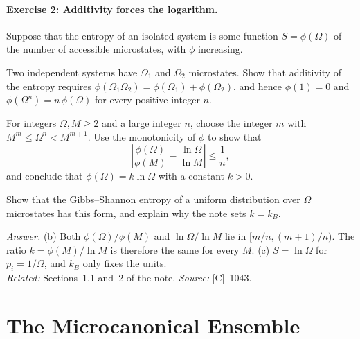 \documentclass[11pt]{article}      %
\numberwithin{equation}{section}   %
\begin{document}
\paragraph{Exercise 2: Additivity forces the logarithm.}
Suppose that the entropy of an isolated system is some function $S = \phi(\Omega)$ of the number of accessible microstates, with $\phi$ increasing.
\begin{parts}
    \item Two independent systems have $\Omega_1$ and $\Omega_2$ microstates. Show that additivity of the entropy requires $\phi(\Omega_1\Omega_2) = \phi(\Omega_1) + \phi(\Omega_2)$, and hence $\phi(1) = 0$ and $\phi(\Omega^n) = n\,\phi(\Omega)$ for every positive integer $n$.
    \item For integers $\Omega, M \ge 2$ and a large integer $n$, choose the integer $m$ with $M^m \le \Omega^n < M^{m+1}$. Use the monotonicity of $\phi$ to show that
    \begin{equation*}
        \left|\frac{\phi(\Omega)}{\phi(M)} - \frac{\ln\Omega}{\ln M}\right| \le \frac{1}{n},
    \end{equation*}
    and conclude that $\phi(\Omega) = k\ln\Omega$ with a constant $k > 0$.
    \item Show that the Gibbs--Shannon entropy of a uniform distribution over $\Omega$ microstates has this form, and explain why the note sets $k = k_B$.
\end{parts}
\textit{Answer.} (b) Both $\phi(\Omega)/\phi(M)$ and $\ln\Omega/\ln M$ lie in $[m/n, (m+1)/n)$. The ratio $k = \phi(M)/\ln M$ is therefore the same for every $M$. (c) $S = \ln\Omega$ for $p_i = 1/\Omega$, and $k_B$ only fixes the units.\\
\textit{Related:} Sections~1.1 and~2 of the note. \textit{Source:} [C]~1043.

\section{The Microcanonical Ensemble}
\end{document}
